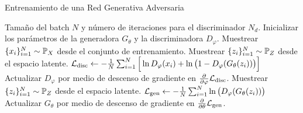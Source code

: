 {{\begin{algorithm}[t!]
    \caption{Entrenamiento de una Red Generativa Adversaria}\label{alg:GAN}
    \begin{algorithmic}[1]
        \Require Tamaño del batch $N$ y número de iteraciones para el discriminador $N_d$.
        \State Inicializar los parámetros de la generadora $G_\theta$ y la discriminadora $D_\varphi$.
        \State Muestrear $\{x_i\}_{i=1}^{N} \sim \Prob_X$ desde el conjunto de entrenamiento.
        \State Muestrear $\{z_i\}_{i=1}^{N} \sim \Prob_Z$ desde el espacio latente.
        \State $\cL_{\mathrm{disc}} \gets -\frac{1}{N}\sum_{i=1}^{N} \Big[ \ln D_\varphi(x_i) + \ln \qty\big(1 - D_\varphi(G_\theta(z_i))) \Big]$
        \State Actualizar $D_\varphi$ por medio de descenso de gradiente en $\pdv{\varphi} \cL_{\mathrm{disc}}$.
        \EndFor
        \State Muestrear $\{z_i\}_{i=1}^{N} \sim \Prob_Z$ desde el espacio latente.
        \State $\cL_{\mathrm{gen}} \gets - \frac{1}{N}\sum_{i=1}^{N} \ln \qty\big(D_\varphi(G_\theta(z_i)))$
        \State Actualizar $G_\theta$ por medio de descenso de gradiente en $\pdv{\theta} \mathcal{L}_{\mathrm{gen}}$.
        \EndWhile
    \end{algorithmic}
\end{algorithm}

}}

